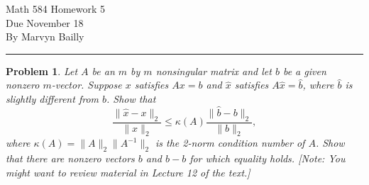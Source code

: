 \documentclass[12pt]{report}
\newtheorem{problem}{Problem}
\begin{document}
\large

\begin{center}
 Math 584 Homework 5\\
 Due November 18\\
 By Marvyn Bailly\\
\end{center}

\normalsize

\hrule



\begin{problem}
    Let $A$ be an $m$ by $m$ nonsingular matrix and let $b$ be a given nonzero
$m$-vector.  Suppose $x$ satisfies $Ax = b$ and $\hat{x}$ satisfies $A \hat{x} =
\hat{b}$, where $\hat{b}$ is slightly different from $b$.  Show that
\[
\frac{\| \hat{x} - x \|_2}{\| x \|_2} \leq \kappa (A) \frac{\| \hat{b} - b \|_2}
{\| b \|_2} ,
\]
where $\kappa (A) = \| A \|_2 \| A^{-1} \|_2$ is the 2-norm condition number
of $A$.  Show that there are nonzero vectors $b$ and $\hat{b} - b$ for which
equality holds.  [Note:  You might want to review material in Lecture 12 of
the text.]
\end{problem}
\end{document}
